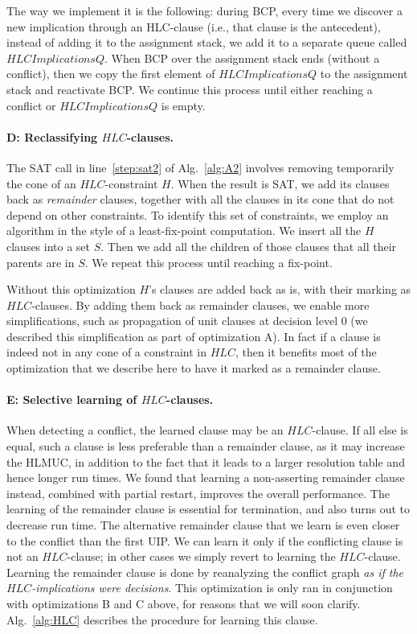 \documentclass[twoside,11pt]{article}
\begin{document}
The way we implement it is the following: during BCP, every time we discover a new implication through an HLC-clause (i.e., that clause is the antecedent), instead of adding it to the assignment stack, we add it to a separate queue called $HLCImplicationsQ$. When BCP over the assignment stack ends (without a conflict), then we copy the first element of $HLCImplicationsQ$ to the assignment stack and reactivate BCP. We continue this process until either reaching a conflict or $HLCImplicationsQ$ is empty.

\paragraph{D: Reclassifying $HLC$-clauses.}
The SAT call in line~\ref{step:sat2} of Alg.~\ref{alg:A2}
involves removing temporarily the cone of an $HLC$-constraint $H$. When the result is SAT, we add its clauses back as \emph{remainder} clauses, together with all the clauses in its cone that do not depend on other
constraints. To identify this set of constraints, we employ an algorithm in
the style of a least-fix-point computation. We insert all the $H$ clauses
into a set $S$. Then we add all the children of those clauses that all their
parents are in $S$. We repeat this process until reaching a fix-point.

Without this optimization $H$'s clauses are added back as is, with their
marking as $HLC$-clauses. By adding them back as remainder clauses, we enable
more simplifications, such as propagation of unit clauses at decision level 0 (we described this simplification as part of optimization  A). In fact if a clause is indeed not in any cone of a constraint in $HLC$, then it benefits
most of the optimization that we describe here to have it marked as a remainder clause.

\paragraph{E: Selective learning of $HLC$-clauses.}
When detecting a conflict, the learned clause may be an $HLC$-clause. If all
else is equal, such a clause is less preferable than a remainder clause, as
it may increase the HLMUC, in addition to the fact that it leads to a larger
resolution table and hence longer run times. We found that learning a
non-asserting remainder clause instead, combined with partial restart,
improves the overall performance. The learning of the remainder clause is
essential for termination, and also turns out to decrease run time. The
alternative remainder clause that we learn is even closer to the conflict
than the first UIP. We can learn it only if the conflicting clause is not an
$HLC$-clause; in other cases we simply revert to learning the $HLC$-clause.
Learning the remainder clause is done by reanalyzing the conflict graph
\emph{as if the $HLC$-implications were decisions}. This optimization is only
ran in conjunction with optimizations  B  and  C  above, for reasons
that we will soon clarify. Alg.~\ref{alg:HLC} describes the procedure for
learning this clause.
\end{document}
